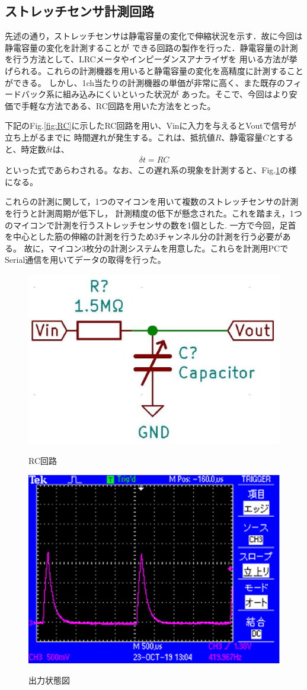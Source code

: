\subsection{ストレッチセンサ計測回路}\label{sec:RC回路}
先述の通り，ストレッチセンサは静電容量の変化で伸縮状況を示す．故に今回は静電容量の変化を計測することが
できる回路の製作を行った．静電容量の計測を行う方法として、LRCメータやインピーダンスアナライザを
用いる方法が挙げられる。これらの計測機器を用いると静電容量の変化を高精度に計測することができる。
しかし、1ch当たりの計測機器の単価が非常に高く、また既存のフィードバック系に組み込みにくいといった状況が
あった。そこで、今回はより安価で手軽な方法である、RC回路を用いた方法をとった。

下記のFig.\ref{fig:RC}に示したRC回路を用い、Vinに入力を与えるとVoutで信号が立ち上がるまでに
時間遅れが発生する。これは、抵抗値$R$、静電容量$C$とすると、時定数$\delta t$は、
\begin{eqnarray}
    \delta t = RC
\end{eqnarray}
といった式であらわされる。なお、この遅れ系の現象を計測すると、Fig.\ref{fig:oscilloscope}の様になる。

これらの計測に関して，1つのマイコンを用いて複数のストレッチセンサの計測を行うと計測周期が低下し，
計測精度の低下が懸念された。これを踏まえ，1つのマイコンで計測を行うストレッチセンサの数を1個とした.
一方で今回，足首を中心とした筋の伸縮の計測を行うため3チャンネル分の計測を行う必要がある。
故に，マイコン3枚分の計測システムを用意した。これらを計測用PCでSerial通信を用いてデータの取得を行った。
\begin{figure}[h]
    \begin{center}
        \includegraphics[width=0.4\columnwidth,clip]{./2_measurement/RC.eps}
        \caption{RC回路}
        \label{fig:RC}
        \includegraphics[width=0.4\columnwidth,clip]{./2_measurement/oscilloscope.eps}
        \caption{出力状態図}
        \label{fig:oscilloscope}
    \end{center}
\end{figure}

